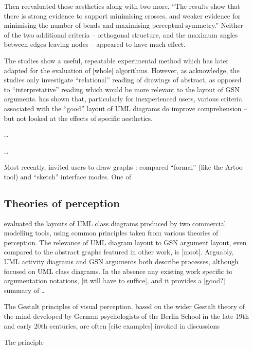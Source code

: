 Then \citet{Purchase1997which} reevaluated these aesthetics along with two more. ``The results show that there is strong
evidence to support minimising crosses, and weaker evidence for minimising the number of bends and maximising perceptual symmetry.''
Neither of the two additional criteria -- orthogonal structure, and the maximum angles between edges leaving nodes -- appeared to have much effect.

The studies show a useful, repeatable experimental method which \citet{PURCHASE1998647} has later adapted for the evaluation of [whole] algorithms.
However, as \citet{Purchase1997which} acknowledge, the studies only investigate ``relational'' reading of drawings of abstract, as opposed to ``interpretative'' reading which would be more relevant to the layout of GSN arguments. \citet{storrle} has shown that, particularly for inexperienced users, various criteria associated with the ``good'' layout of UML diagrams do improve comprehension -- but not looked at the effects of specific aesthetics.

\ldots

\citet{huang2007effects}

\ldots

Most recently, \citet{5674033} invited users to draw graphs :
compared ``formal'' (like the Artoo tool) and ``sketch'' interface modes.
One of

\subsection{Theories of perception}

\citet{kennysun} evaluated the layouts of UML class diagrams produced by two commercial modelling tools, using common principles taken from various theories of perception.
The relevance of UML diagram layout to GSN argument layout, even compared to the abstract graphs featured in other work, is [moot].
Arguably, UML activity diagrams and GSN arguments both describe processes, although \citeauthor{kennysun} focused on UML class diagrams.
In the absence any existing work specific to argumentation notations, [it will have to suffice], and it provides a [good?] summary of \ldots


The Gestalt principles of visual perception,
based on the wider Gestalt theory of the mind developed by German psychologists of the Berlin School in the late 19th and early 20th centuries,
are often [cite examples] \citep[136]{storrle} invoked in discussions 

The principle 


